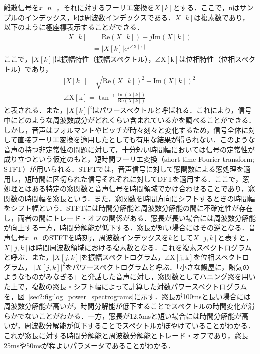 \documentclass[12pt]{jarticle}
\numberwithin{equation}{section}    %
\numberwithin{figure}{section}      %
\numberwithin{table}{section}      %
\begin{document}
離散信号を$x[n]$，それに対するフーリエ変換を$X[k]$とする．ここで，nはサンプルのインデックス，kは周波数インデックスである．$X[k]$は複素数であり，以下のように極座標表示することができる．
\begin{align}
    X[k] & = \mathrm{Re}(X[k]) + j\mathrm{Im}(X[k]) \\
         & = |X[k]|e^{j\angle\mathrm{X[k]}}
\end{align}
ここで，$|X[k]|$は振幅特性（振幅スペクトル），$\angle\mathrm{X[k]}$は位相特性（位相スペクトル）であり，
\begin{gather}
    |X[k]| = \sqrt{\mathrm{Re}(X[k])^{2} + \mathrm{Im}(X[k])^{2}} \\
    \angle\mathrm{X[k]} = \tan^{-1} \frac{\mathrm{Im}(X[k])}{\mathrm{Re}(X[k])}
\end{gather}
と表される．また，$|X[k]|^2$はパワースペクトルと呼ばれる．これにより，信号中にどのような周波数成分がどれくらい含まれているかを調べることができる．しかし，音声はフォルマントやピッチが時々刻々と変化するため，信号全体に対して直接フーリエ変換を適用したとしても有用な結果が得られない．このような音声の持つ非定常性の問題に対して，十分短い時間幅においては信号の定常性が成り立つという仮定のもと，短時間フーリエ変換（short-time Fourier transform; STFT）が用いられる．STFTでは，音声信号に対して窓関数による窓処理を適用し，短時間に区切られた信号それぞれに対してDFTを適用する．ここで，窓処理とはある特定の窓関数と音声信号を時間領域でかけ合わせることであり，窓関数の時間幅を窓長という．また，窓関数を時間方向にシフトするときの時間幅をシフト幅という．STFTには時間分解能と周波数分解能の間に不確定性が存在し，両者の間にトレード・オフの関係がある．窓長が長い場合には周波数分解能が向上する一方，時間分解能が低下する．窓長が短い場合にはその逆となる．音声信号$x[n]$のSTFTを時刻$j$，周波数インデックスを$k$として$X[j, k]$と表すと，$X[j, k]$は時間周波数領域における複素数となる．これを複素スペクトログラムと呼ぶ．また，$|X[j, k]|$を振幅スペクトログラム，$\angle\mathrm{X[j, k]}$を位相スペクトログラム，
$|X[j, k]|^{2}$をパワースペクトログラムと呼ぶ．「小さな鰻屋に，熱気のようなものがみなぎる」と発話した音声に対し，窓関数としてハニング窓を用いた上で，複数の窓長・シフト幅によって計算した対数パワースペクトログラムを，図~\ref{sec2:fig:log_power_spectrograms}に示す．窓長が100msと長い場合には周波数分解能が高いが，時間分解能が低下することでスペクトルの時間変化が滑らかでないことがわかる．一方，窓長が12.5msと短い場合には時間分解能が高いが，周波数分解能が低下することでスペクトルがぼやけていることがわかる．これが窓長に対する時間分解能と周波数分解能とトレード・オフであり，窓長25msや50msが程よいパラメータであることがわかる．
\end{document}
